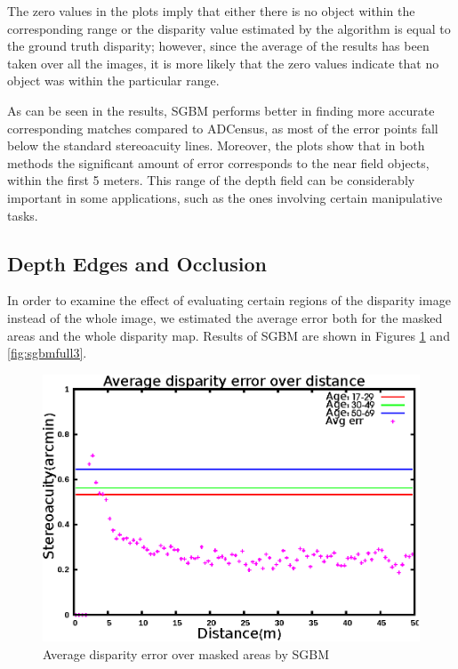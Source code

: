 The zero values in the plots imply that either there is no object within the corresponding range or the disparity value estimated by the algorithm
is equal to the ground truth disparity; however, since the average of the results has been taken over all the images, it is more likely that 
the zero values indicate that no object was within the particular range.

As can be seen in the results, SGBM performs better in finding more accurate corresponding matches 
compared to ADCensus, as most of the error points fall below the standard stereoacuity lines. Moreover, the plots show that in both methods 
the significant amount of error
corresponds to the near field objects, within the first 5 meters. This range of the depth field can be considerably important in some applications,
such as the ones involving certain manipulative tasks.

\subsection{Depth Edges and Occlusion}
In order to examine the effect of evaluating certain regions of the disparity image instead of the whole image, 
we estimated the average error both for the masked areas and the whole disparity map. 
Results of SGBM are shown in Figures \ref{fig:sgbmmsk3} and \ref{fig:sgbmfull3}.

\begin{figure}[H]
\centering
\includegraphics[scale=0.95]{sgbmmsk3}
\caption{Average disparity error over masked areas by SGBM}
\label{fig:sgbmmsk3}
\end{figure} 

